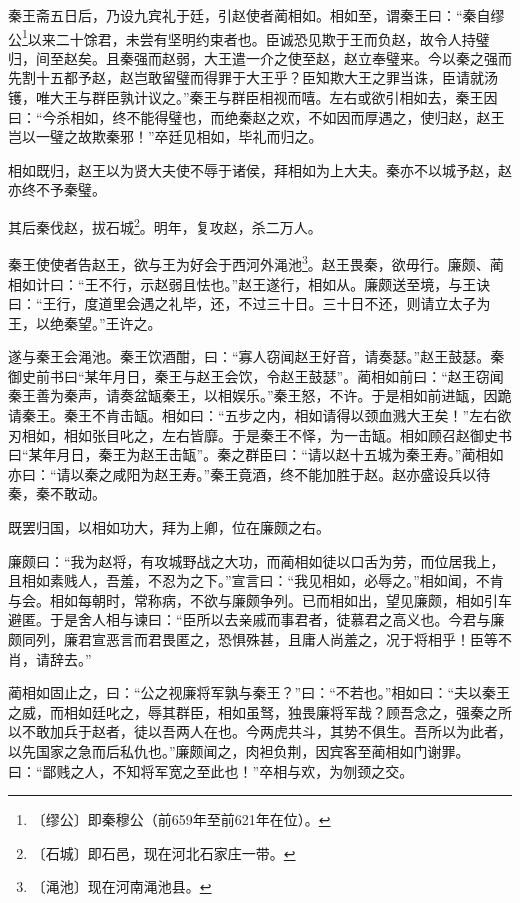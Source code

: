 \documentclass[12pt,UTF-8,openany,a4]{ctexbook}
\begin{document}
\begin{large}
    秦王斋五日后，乃设九宾礼于廷，引赵使者蔺相如。相如至，谓秦王曰：“秦自缪公\footnote{〔缪公〕\yiwen 即秦穆公（前659年至前621年在位）。}以来二十馀君，未尝有坚明约束者也。臣诚恐见欺于王而负赵，故令人持璧归，间至赵矣。且秦强而赵弱，大王遣一介之使至赵，赵立奉璧来。今以秦之强而先割十五都予赵，赵岂敢留璧而得罪于大王乎？臣知欺大王之罪当诛，臣请就汤镬，唯大王与群臣孰计议之。”秦王与群臣相视而嘻。左右或欲引相如去，秦王因曰：“今杀相如，终不能得璧也，而绝秦赵之欢，不如因而厚遇之，使归赵，赵王岂以一璧之故欺秦邪！”卒廷见相如，毕礼而归之。
    
    相如既归，赵王以为贤大夫使不辱于诸侯，拜相如为上大夫。秦亦不以城予赵，赵亦终不予秦璧。
    
    其后秦伐赵，拔石城\footnote{〔石城〕\yiwen 即石邑，现在河北石家庄一带。}。明年，复攻赵，杀二万人。
    
    秦王使使者告赵王，欲与王为好会于西河外渑池\footnote{〔渑池〕\yiwen 现在河南渑池县。}。赵王畏秦，欲毋行。廉颇、蔺相如计曰：“王不行，示赵弱且怯也。”赵王遂行，相如从。廉颇送至境，与王诀曰：“王行，度道里会遇之礼毕，还，不过三十日。三十日不还，则请立太子为王，以绝秦望。”王许之。
    
    遂与秦王会渑池。秦王饮酒酣，曰：“寡人窃闻赵王好音，请奏瑟。”赵王鼓瑟。秦御史前书曰“某年月日，秦王与赵王会饮，令赵王鼓瑟”。蔺相如前曰：“赵王窃闻秦王善为秦声，请奏盆缻秦王，以相娱乐。”秦王怒，不许。于是相如前进缻，因跪请秦王。秦王不肯击缻。相如曰：“五步之内，相如请得以颈血溅大王矣！”左右欲刃相如，相如张目叱之，左右皆靡。于是秦王不怿，为一击缻。相如顾召赵御史书曰“某年月日，秦王为赵王击缻”。秦之群臣曰：“请以赵十五城为秦王寿。”蔺相如亦曰：“请以秦之咸阳为赵王寿。”秦王竟酒，终不能加胜于赵。赵亦盛设兵以待秦，秦不敢动。
    
    既罢归国，以相如功大，拜为上卿，位在廉颇之右。
    
    廉颇曰：“我为赵将，有攻城野战之大功，而蔺相如徒以口舌为劳，而位居我上，且相如素贱人，吾羞，不忍为之下。”宣言曰：“我见相如，必辱之。”相如闻，不肯与会。相如每朝时，常称病，不欲与廉颇争列。已而相如出，望见廉颇，相如引车避匿。于是舍人相与谏曰：“臣所以去亲戚而事君者，徒慕君之高义也。今君与廉颇同列，廉君宣恶言而君畏匿之，恐惧殊甚，且庸人尚羞之，况于将相乎！臣等不肖，请辞去。”
    
    蔺相如固止之，曰：“公之视廉将军孰与秦王？”曰：“不若也。”相如曰：“夫以秦王之威，而相如廷叱之，辱其群臣，相如虽驽，独畏廉将军哉？顾吾念之，强秦之所以不敢加兵于赵者，徒以吾两人在也。今两虎共斗，其势不俱生。吾所以为此者，以先国家之急而后私仇也。”廉颇闻之，肉袒负荆，因宾客至蔺相如门谢罪。曰：“鄙贱之人，不知将军宽之至此也！”卒相与欢，为刎颈之交。

\end{large}
\end{document}
